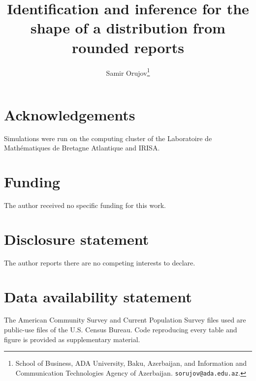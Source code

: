 \documentclass[12pt]{article}
\title{Identification and inference for the shape of a distribution from rounded reports}
\author{}
\author{Samir Orujov\thanks{School of Business, ADA University, Baku, Azerbaijan, and Information and Communication Technologies Agency of Azerbaijan. \texttt{sorujov@ada.edu.az}.}}
\date{}
\theoremstyle{definition}
\theoremstyle{remark}
\newif\ifanon
\begin{document}
\maketitle











\ifanon\else
\section*{Acknowledgements}
Simulations were run on the computing cluster of the Laboratoire de Math\'ematiques de Bretagne Atlantique and IRISA.
\fi
\section*{Funding}
The author received no specific funding for this work.
\section*{Disclosure statement}
The author reports there are no competing interests to declare.
\section*{Data availability statement}
The American Community Survey and Current Population Survey files used are public-use files of the U.S. Census Bureau. Code reproducing every table and figure is provided as supplementary material.


\end{document}
